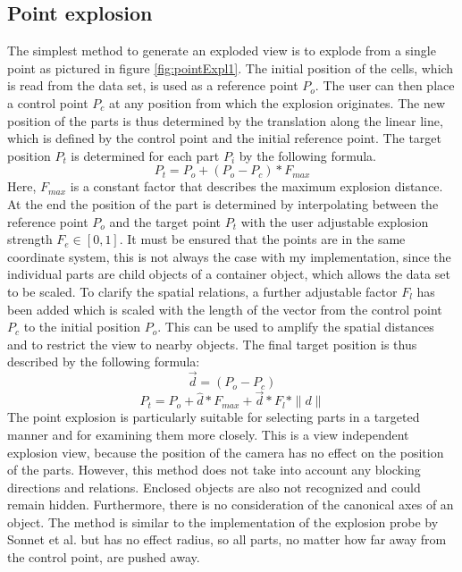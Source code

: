 \subsection{Point explosion}
The simplest method to generate an exploded view is to explode from a single point as pictured in figure \ref{fig:pointExpl1}.
The initial position of the cells, which is read from the data set, is used as a reference point $P_o$. 
The user can then place a control point $P_c$ at any position from which the explosion originates. 
The new position of the parts is thus determined by the translation along the linear line, which is defined by the control point and the initial reference point.
The target position $P_t$ is determined for each part $P_i$ by the following formula. 
\begin{equation}
	P_t = P_o + (P_o - P_c) * F_{max}
	\label{eq:pointExpl1}
\end{equation}
Here, $F_{max}$ is a constant factor that describes the maximum explosion distance. At the end the position of the part is determined by interpolating between the reference point $P_o$ and the target point $P_t$ with the user adjustable explosion strength $F_e \in [0, 1]$.
It must be ensured that the points are in the same coordinate system, this is not always the case with my implementation, since the individual parts are child objects of a container object, which allows the data set to be scaled.
To clarify the spatial relations, a further adjustable factor $F_l$ has been added which is scaled with the length of the vector from the control point $P_c$ to the initial position $P_o$. This can be used to amplify the spatial distances and to restrict the view to nearby objects.
The final target position is thus described by the following formula:
\begin{equation}
	\vec{d} = (P_o - P_c) 
	\label{eq:pointExpl2}
\end{equation}
\begin{equation} 
	P_t = P_o + \hat{d} * F_{max} + \vec{d} * F_l * \|d\|
	\label{eq:pointExpl3}
\end{equation}
The point explosion is particularly suitable for selecting parts in a targeted manner and for examining them more closely.
This is a view independent explosion view, because the position of the camera has no effect on the position of the parts. 
However, this method does not take into account any blocking directions and relations. 
Enclosed objects are also not recognized and could remain hidden.
Furthermore, there is no consideration of the canonical axes of an object.
The method is similar to the implementation of the explosion probe by Sonnet et al.\cite{Sonnet_2004} but has no effect radius, so all parts, no matter how far away from the control point, are pushed away.

